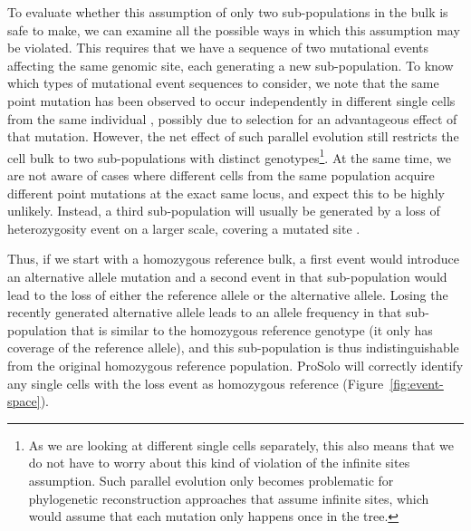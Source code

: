 \documentclass[authoryear,preprint,11pt]{scrartcl}
\begin{document}
To evaluate whether this assumption of only two sub-populations in the bulk is safe to make, we can examine all the possible ways in which this assumption may be violated.
This requires that we have a sequence of two mutational events affecting the same genomic site, each generating a new sub-population.
To know which types of mutational event sequences to consider, we note that the same point mutation has been observed to occur independently in different single cells from the same individual \citep{kuipers_single-cell_2017}, possibly due to selection for an advantageous effect of that mutation.
However, the net effect of such parallel evolution still restricts the cell bulk to two sub-populations with distinct genotypes\footnote{As we are looking at different single cells separately, this also means that we do not have to worry about this kind of violation of the infinite sites assumption. Such parallel evolution only becomes problematic for phylogenetic reconstruction approaches that assume infinite sites, which would assume that each mutation only happens once in the tree.}.
At the same time, we are not aware of cases where different cells from the same population acquire different point mutations at the exact same locus, and expect this to be highly unlikely.
Instead, a third sub-population will usually be generated by a loss of heterozygosity event on a larger scale, covering a mutated site \citep{kuipers_single-cell_2017,satas_scarlet_2020}.

Thus, if we start with a homozygous reference bulk, a first event would introduce an alternative allele mutation and a second event in that sub-population would lead to the loss of either the reference allele or the alternative allele.
Losing the recently generated alternative allele leads to an allele frequency in that sub-population that is similar to the homozygous reference genotype (it only has coverage of the reference allele), and this sub-population is thus indistinguishable from the original homozygous reference population.
ProSolo will correctly identify any single cells with the loss event as homozygous reference (Figure~\ref{fig:event-space}).
\end{document}
